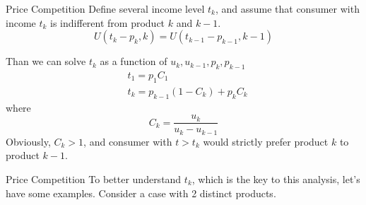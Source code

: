 \documentclass[10pt]{beamer}
\begin{document}
\begin{frame}{Price Competition}
Define several income level $t_k$, and assume that consumer with income $t_k$ is indifferent from product $k$ and $k-1$.
\begin{equation}
    U(t_k - p_k,k) = U(t_{k-1} - p_{k-1}, k-1)
\end{equation}

Than we can solve $t_k$ as a function of $u_k, u_{k-1}, p_k, p_{k-1}$
\begin{equation}
    \begin{split}
        & t_1 = p_1 C_1 \\
        & t_k = p_{k-1}(1 - C_k) + p_k C_k
    \end{split}
\end{equation}
where
\begin{equation}
    C_k = \frac{u_k}{u_k - u_{k-1}}
\end{equation}
Obviously, $C_k > 1 $, and consumer with $t > t_k$ would strictly prefer product $k$ to product $k-1$.
\end{frame}

\begin{frame}[t]{Price Competition}
To better understand $t_k$, which is the key to this analysis, let's have some examples. Consider a case with 2 distinct products.
\break


\end{frame}
\end{document}
